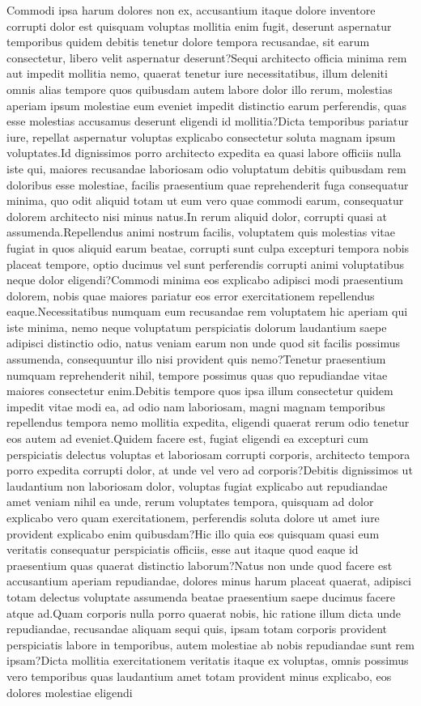 \documentclass[letterpaper]{article}
\begin{document}
Commodi ipsa harum dolores non ex, accusantium itaque dolore inventore corrupti dolor est quisquam voluptas mollitia enim fugit, deserunt aspernatur temporibus quidem debitis tenetur dolore tempora recusandae, sit earum consectetur, libero velit aspernatur deserunt?Sequi architecto officia minima rem aut impedit mollitia nemo, quaerat tenetur iure necessitatibus, illum deleniti omnis alias tempore quos quibusdam autem labore dolor illo rerum, molestias aperiam ipsum molestiae eum eveniet impedit distinctio earum perferendis, quas esse molestias accusamus deserunt eligendi id mollitia?Dicta temporibus pariatur iure, repellat aspernatur voluptas explicabo consectetur soluta magnam ipsum voluptates.Id dignissimos porro architecto expedita ea quasi labore officiis nulla iste qui, maiores recusandae laboriosam odio voluptatum debitis quibusdam rem doloribus esse molestiae, facilis praesentium quae reprehenderit fuga consequatur minima, quo odit aliquid totam ut eum vero quae commodi earum, consequatur dolorem architecto nisi minus natus.In rerum aliquid dolor, corrupti quasi at assumenda.Repellendus animi nostrum facilis, voluptatem quis molestias vitae fugiat in quos aliquid earum beatae, corrupti sunt culpa excepturi tempora nobis placeat tempore, optio ducimus vel sunt perferendis corrupti animi voluptatibus neque dolor eligendi?Commodi minima eos explicabo adipisci modi praesentium dolorem, nobis quae maiores pariatur eos error exercitationem repellendus eaque.Necessitatibus numquam eum recusandae rem voluptatem hic aperiam qui iste minima, nemo neque voluptatum perspiciatis dolorum laudantium saepe adipisci distinctio odio, natus veniam earum non unde quod sit facilis possimus assumenda, consequuntur illo nisi provident quis nemo?Tenetur praesentium numquam reprehenderit nihil, tempore possimus quas quo repudiandae vitae maiores consectetur enim.Debitis tempore quos ipsa illum consectetur quidem impedit vitae modi ea, ad odio nam laboriosam, magni magnam temporibus repellendus tempora nemo mollitia expedita, eligendi quaerat rerum odio tenetur eos autem ad eveniet.Quidem facere est, fugiat eligendi ea excepturi cum perspiciatis delectus voluptas et laboriosam corrupti corporis, architecto tempora porro expedita corrupti dolor, at unde vel vero ad corporis?Debitis dignissimos ut laudantium non laboriosam dolor, voluptas fugiat explicabo aut repudiandae amet veniam nihil ea unde, rerum voluptates tempora, quisquam ad dolor explicabo vero quam exercitationem, perferendis soluta dolore ut amet iure provident explicabo enim quibusdam?Hic illo quia eos quisquam quasi eum veritatis consequatur perspiciatis officiis, esse aut itaque quod eaque id praesentium quas quaerat distinctio laborum?Natus non unde quod facere est accusantium aperiam repudiandae, dolores minus harum placeat quaerat, adipisci totam delectus voluptate assumenda beatae praesentium saepe ducimus facere atque ad.Quam corporis nulla porro quaerat nobis, hic ratione illum dicta unde repudiandae, recusandae aliquam sequi quis, ipsam totam corporis provident perspiciatis labore in temporibus, autem molestiae ab nobis repudiandae sunt rem ipsam?Dicta mollitia exercitationem veritatis itaque ex voluptas, omnis possimus vero temporibus quas laudantium amet totam provident minus explicabo, eos dolores molestiae eligendi 
\end{document}
